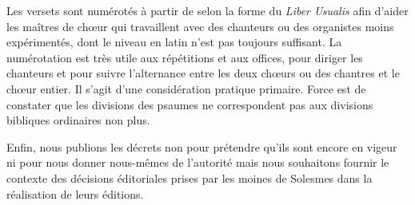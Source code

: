 \begin{frpars}
Les versets sont numérotés à partir de  selon la forme du \textit{Liber Usualis} afin d'aider les maîtres de chœur qui travaillent avec des chanteurs ou des organistes moins expérimentés, dont le niveau en latin n'est pas toujours suffisant. La numérotation est très utile aux répétitions et aux offices, pour diriger les chanteurs et pour suivre l'alternance entre les deux chœurs ou des chantres et le chœur entier. Il s'agit d'une considération pratique primaire. Force est de constater que les divisions des psaumes ne correspondent pas aux divisions bibliques ordinaires non plus.

Enfin, nous publions les décrets non pour prétendre qu'ils sont encore en vigeur ni pour nous donner nous-mêmes de l'autorité mais nous souhaitons fournir le contexte des décisions éditoriales prises par les moines de Solesmes dans la réalisation de leurs éditions.
\end{frpars}